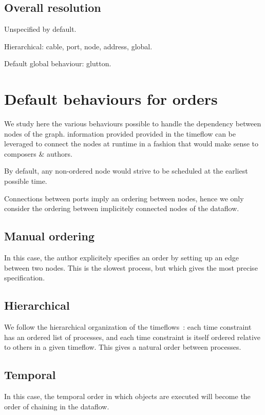 \documentclass{article}
\begin{document}
\subsection{Overall resolution}
Unspecified by default. 
    
Hierarchical: cable, port, node, address, global.
    
Default global behaviour: glutton.
    
  
\section{Default behaviours for orders}
\label{sec.order}
We study here the various behaviours possible to handle the dependency between nodes of the graph.
information provided provided in the timeflow can be leveraged to connect the nodes at runtime in a fashion 
that would make sense to composers \& authors.
    
By default, any non-ordered node would strive to be scheduled at the earliest possible time.
    
Connections between ports imply an ordering between nodes, hence we only consider the ordering between implicitely connected nodes of the dataflow.
    
\subsection{Manual ordering}
In this case, the author explicitely specifies an order by setting up an edge between two nodes. 
This is the slowest process, but which gives the most precise specification.
    
\subsection{Hierarchical}
We follow the hierarchical organization of the timeflows~: each time constraint has an ordered list of processes, and each time constraint is itself ordered relative to others in a given timeflow. 
This gives a natural order between processes.
    
\subsection{Temporal}
In this case, the temporal order in which objects are executed
will become the order of chaining in the dataflow.
    
\end{document}
